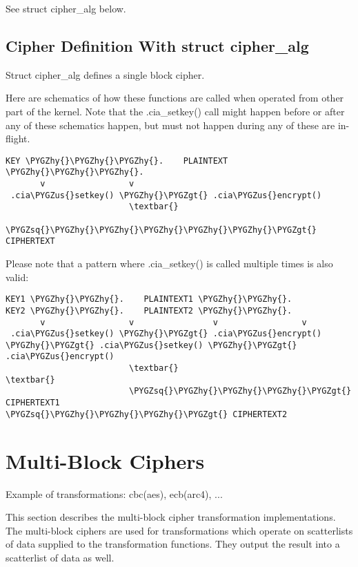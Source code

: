 \documentclass[a4paper,8pt,english]{sphinxmanual}
\def\PYGZus{\char`\_}
\def\PYGZgt{\char`\>}
\def\PYGZhy{\char`\-}
\def\PYGZsq{\char`\'}
\renewcommand\PYGZsq{\textquotesingle}
\begin{document}
See struct cipher\_alg below.


\subsection{Cipher Definition With struct cipher\_alg}
\label{crypto/devel-algos:cipher-definition-with-struct-cipher-alg}
Struct cipher\_alg defines a single block cipher.

Here are schematics of how these functions are called when operated from
other part of the kernel. Note that the .cia\_setkey() call might happen
before or after any of these schematics happen, but must not happen
during any of these are in-flight.

\begin{Verbatim}[commandchars=\\\{\}]
KEY \PYGZhy{}\PYGZhy{}\PYGZhy{}.    PLAINTEXT \PYGZhy{}\PYGZhy{}\PYGZhy{}.
       v                 v
 .cia\PYGZus{}setkey() \PYGZhy{}\PYGZgt{} .cia\PYGZus{}encrypt()
                         \textbar{}
                         \PYGZsq{}\PYGZhy{}\PYGZhy{}\PYGZhy{}\PYGZhy{}\PYGZhy{}\PYGZgt{} CIPHERTEXT
\end{Verbatim}

Please note that a pattern where .cia\_setkey() is called multiple times
is also valid:

\begin{Verbatim}[commandchars=\\\{\}]
KEY1 \PYGZhy{}\PYGZhy{}.    PLAINTEXT1 \PYGZhy{}\PYGZhy{}.         KEY2 \PYGZhy{}\PYGZhy{}.    PLAINTEXT2 \PYGZhy{}\PYGZhy{}.
       v                 v                v                 v
 .cia\PYGZus{}setkey() \PYGZhy{}\PYGZgt{} .cia\PYGZus{}encrypt() \PYGZhy{}\PYGZgt{} .cia\PYGZus{}setkey() \PYGZhy{}\PYGZgt{} .cia\PYGZus{}encrypt()
                         \textbar{}                                  \textbar{}
                         \PYGZsq{}\PYGZhy{}\PYGZhy{}\PYGZhy{}\PYGZgt{} CIPHERTEXT1                  \PYGZsq{}\PYGZhy{}\PYGZhy{}\PYGZhy{}\PYGZgt{} CIPHERTEXT2
\end{Verbatim}


\section{Multi-Block Ciphers}
\label{crypto/devel-algos:multi-block-ciphers}
Example of transformations: cbc(aes), ecb(arc4), ...

This section describes the multi-block cipher transformation
implementations. The multi-block ciphers are used for transformations
which operate on scatterlists of data supplied to the transformation
functions. They output the result into a scatterlist of data as well.
\end{document}
